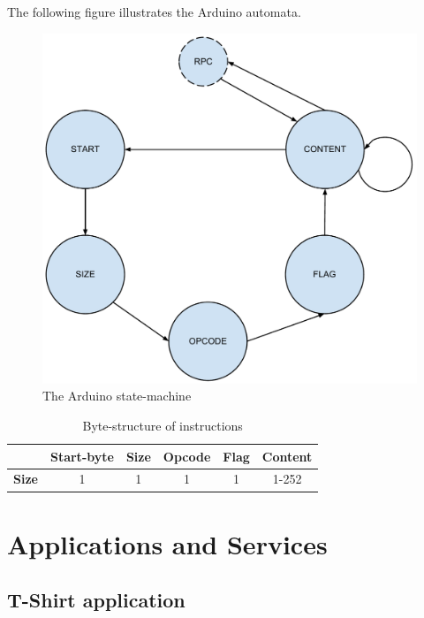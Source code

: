 The following figure illustrates the Arduino automata.

\begin{figure}[h!]
\centering
\includegraphics[width=\textwidth, keepaspectratio]{img/arduino_state-machine.pdf}
\caption{The Arduino state-machine}
\label{fig:arduino_states}
\end{figure}

\begin{table}
\begin{tabular}{c|c|c|c|c|c|}
\cline{2-6}
& \textbf{Start-byte} & \textbf{Size} & \textbf{Opcode} & \textbf{Flag} & \textbf{Content} \\
\hline
\multicolumn{1}{|c|}{\textbf{Size}} & 1 & 1 & 1 & 1 & 1-252 \\
\hline
\end{tabular}
\caption{Byte-structure of instructions}
\label{tbl:instr_struct}
\end{table}

\newpage
\section{Applications and Services}

\subsection{T-Shirt application}

